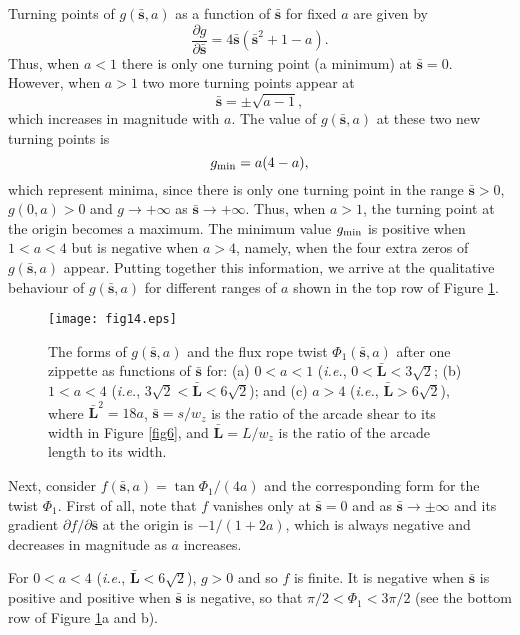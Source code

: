 \documentclass[10pt,namedreferneces]{SolarPhysics}
\begin{document}
\begin{article}
Turning points of $g({\bm\bar s},a)$ as a function of ${\bm\bar s}$ for fixed $a$ are given by
\begin{equation}
\frac{\partial g}{\partial {\bm\bar s}}=4{\bm\bar s}({\bm\bar s}^2+1-a).
\label{app4}
\end{equation}
Thus, when $a<1$ there is only one turning point (a minimum) at ${\bm\bar s}=0$. However, when $a>1$ two more turning points appear at
\begin{equation}
{\bm\bar s}=\pm\sqrt{a-1},
\label{app5}
\end{equation}
which increases in magnitude with $a$.
The value of $g({\bm\bar s},a)$ at these two new turning points is
\begin{equation}
g_{\rm min}=a(4-a),
\label{app6}
\end{equation}
which represent minima, since there is only one turning point in the range ${\bm\bar s}>0$, $g(0,a)>0$ and $g\rightarrow +\infty$ as ${\bm\bar s}\rightarrow +\infty$. Thus, when $a>1$, the turning point at the origin becomes a maximum. The minimum value $g_{\rm min}$ is positive when $1<a<4$ but is negative when $a>4$, namely, when the four extra zeros of $g({\bm\bar s},a)$ appear.  Putting together this information, we arrive at the qualitative behaviour of $g({\bm\bar s},a)$ for different ranges of $a$ shown in the top row of Figure \ref{fig14}.

\begin{figure}[h]
{\centering
 \texttt{[image: fig14.eps]}
\caption{The forms of $g({\bm\bar s},a)$ and the flux rope twist $\Phi_1({\bm\bar s},a)$ after one zippette as functions of ${\bm\bar s}$ for: (a) $0<a<1$ (\textit{i.e.}, $0<\bm\bar{L}<3\sqrt 2$; (b) $1<a<4$ (\textit{i.e.}, $3\sqrt 2<\bm\bar{L}<6\sqrt 2$); and  (c) $a>4$ (\textit{i.e.}, $\bm\bar{L}>6\sqrt 2$), where $\bm\bar{L}^2 =18a$, ${\bm\bar s}=s/w_z$ is the ratio of the arcade shear  to its width  in Figure \ref{fig6}, and ${\bm\bar L}=L/w_z$ is the ratio of the arcade length to its width.}
\label{fig14}}
\end{figure}
Next, consider $f({\bm\bar s},a)=\tan \Phi_1/(4a)$ and the corresponding form for the twist $\Phi_1$. First of all, note that $f$ vanishes only at ${\bm\bar s}=0$ and as ${\bm\bar s}\rightarrow \pm \infty$ and its gradient $\partial f/\partial {\bm\bar s}$ at the origin is $-1/(1+2a)$, which is always negative and decreases in magnitude as $a$ increases.

For $0<a<4$ (\textit{i.e.}, ${\bm\bar L}<6\sqrt 2$), $g>0$ and so $f$ is finite. It is negative when ${\bm\bar s}$ is positive and positive when ${\bm\bar s}$ is negative, so that $\pi/2<\Phi_1<3\pi/2$ (see the bottom row of Figure \ref{fig14}a and b).


\end{article}
\end{document}
